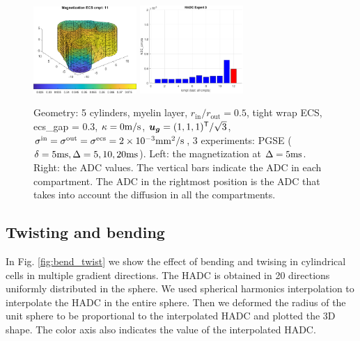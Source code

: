 \documentclass[a4paper]{article}
\begin{document}
\begin{figure}
    \vspace{0.2cm}
    \includegraphics[width=0.35\textwidth]{plot_magnetization/5cyl_ecs_myelin.png} \quad
    \includegraphics[width=0.35\textwidth]{plot_adc/hadc_5cyl3.pdf}
    \caption{Geometry: 5 cylinders, myelin layer, $r_\text{in}/r_\text{out}=0.5$, tight wrap ECS, ecs\_gap = 0.3, $\kappa=0\mathrm{m/s}$, $\bm{u}_{\bm{g}} = (1,1,1)^{\mathsf{T}} / \sqrt{3}$, $\sigma^\text{in}=\sigma^\text{out}=\sigma^\text{ecs}=2\times10^{-3}\mathrm{mm^2/s}$, 3 experiments: PGSE ($\delta=5\mathrm{ms},\Delta=5,10,20\mathrm{ms}$). Left: the magnetization at $\Delta=5\mathrm{ms}$. Right: the ADC values. The vertical bars indicate the ADC in each compartment. The ADC in the rightmost position is the ADC that takes into account the diffusion in all the compartments.}
    \label{fig:myelin}
\end{figure}





\subsection{Twisting and bending}

In Fig. \ref{fig:bend_twist} we show the effect of bending and twising in cylindrical cells in multiple gradient directions. The HADC is obtained in 20 directions uniformly distributed in the sphere. We used spherical harmonics interpolation to interpolate the HADC in the entire sphere. Then we deformed the radius of the unit sphere to be proportional to the interpolated HADC and plotted the 3D shape. The color axis also indicates the value of the interpolated HADC.
\end{document}
